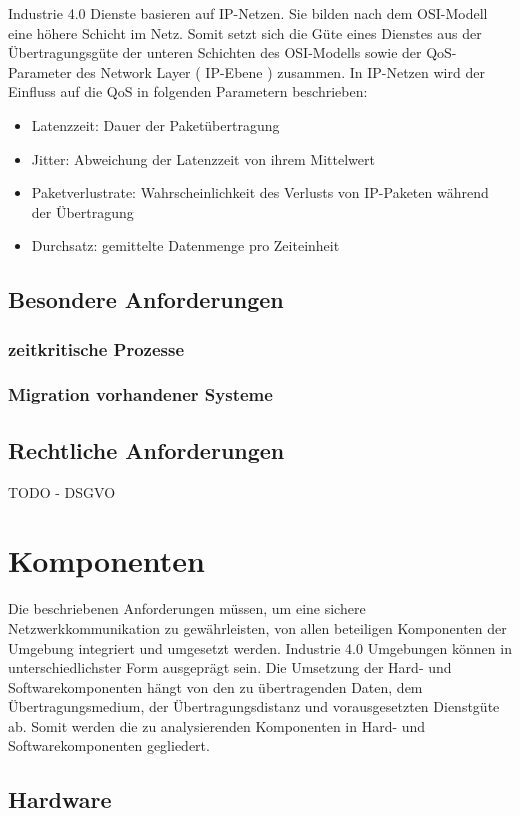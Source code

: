 Industrie 4.0 Dienste basieren auf IP-Netzen. Sie bilden nach dem OSI-Modell eine höhere Schicht im Netz. Somit setzt sich die Güte eines Dienstes aus der Übertragungsgüte der unteren Schichten des  OSI-Modells sowie der \ac{QoS}-Parameter des Network Layer ( IP-Ebene ) zusammen. In IP-Netzen wird der Einfluss auf die \ac{QoS} in folgenden Parametern beschrieben:
\begin{itemize}
    \item Latenzzeit: Dauer der Paketübertragung
    \item Jitter: Abweichung der Latenzzeit von ihrem Mittelwert
    \item Paketverlustrate: Wahrscheinlichkeit des Verlusts von IP-Paketen während der Übertragung
    \item Durchsatz: gemittelte Datenmenge pro Zeiteinheit
\end{itemize}

\subsection{Besondere Anforderungen}
\subsubsection{zeitkritische Prozesse}
\subsubsection{Migration vorhandener Systeme}

\subsection{Rechtliche Anforderungen}
TODO - DSGVO

\section{Komponenten}
Die beschriebenen Anforderungen müssen, um eine sichere Netzwerkkommunikation zu gewährleisten, von allen beteiligen Komponenten der Umgebung integriert und umgesetzt werden. Industrie 4.0 Umgebungen können in unterschiedlichster Form ausgeprägt sein. Die Umsetzung der Hard- und Softwarekomponenten hängt von den zu übertragenden Daten, dem Übertragungsmedium, der Übertragungsdistanz und vorausgesetzten Dienstgüte ab. Somit werden die zu analysierenden Komponenten in Hard- und Softwarekomponenten gegliedert.

\subsection{Hardware}
